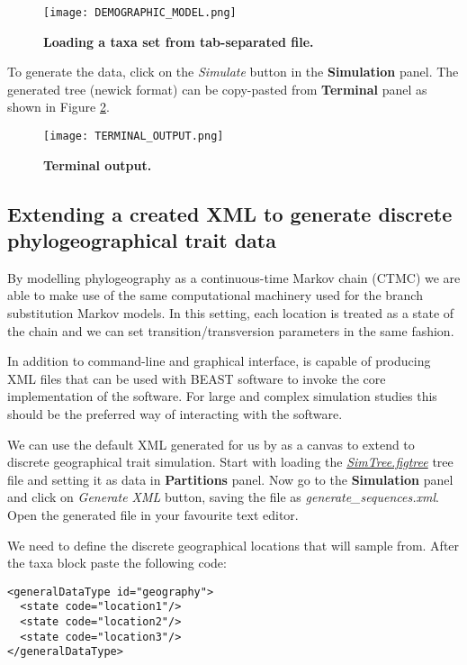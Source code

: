 \begin{figure}[h!]
\centering
\texttt{[image: DEMOGRAPHIC\_MODEL.png]} 
\caption{
{ \footnotesize 
{\bf Loading a taxa set from tab-separated file.}
} %
}
\label{fig:DemoModel}
\end{figure}  

To generate the data, click on the \emph{Simulate} button in the \textbf{Simulation} panel. The generated tree (newick format) can be copy-pasted from \textbf{Terminal} panel as shown in Figure \ref{fig:Terminal}.

\begin{figure}[h!]
\centering
\texttt{[image: TERMINAL\_OUTPUT.png]} 
\caption{
{ \footnotesize 
{\bf Terminal output.}
} %
}
\label{fig:Terminal}
\end{figure} 

\subsection{Extending a created XML to generate discrete phylogeographical trait data}
By modelling  phylogeography as a continuous-time Markov chain (CTMC) we are able to make use of the same computational machinery used for the branch substitution Markov models. In this setting, each location is treated as a state of the chain and we can set transition/transversion parameters in the same fashion.

In addition to command-line and graphical interface, {\bussname} is capable of producing XML files that can be used with BEAST software to invoke the core implementation of the software. 
For large and complex simulation studies this should be the preferred way of interacting with the software.

We can use the default XML generated for us by {\bussname} as a canvas to extend to discrete geographical trait simulation. 
Start with loading the \href{http://rega.kuleuven.be/cev/ecv/software/buss_files/simtree.figtree}{\emph{SimTree.figtree}} tree file and setting it as data in \textbf{Partitions} panel. 
Now go to the \textbf{Simulation} panel and click on \emph{Generate XML} button, saving the file as \emph{generate\_sequences.xml}.
Open the generated file in your favourite text editor.

We need to define the discrete geographical locations that {\bussname} will sample from. After the  {\color{darkblue}taxa} block paste the following code:

\begin{lstlisting}
<generalDataType id="geography"> 
  <state code="location1"/>
  <state code="location2"/>
  <state code="location3"/>
</generalDataType>
\end{lstlisting}

